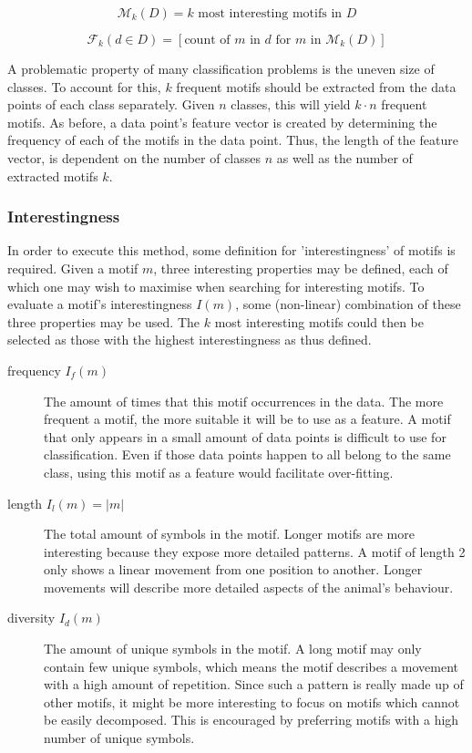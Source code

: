 \documentclass[conference,a4paper,twoside]{IEEEtran}
\begin{document}
\begin{equation}
    \label{eq:kmotifs}
    \mathcal{M}_k(D) = \text{$k$ most interesting motifs in $D$}
\end{equation}

\begin{equation}
    \label{eq:features}
    \mathcal{F}_k(d \in D) = \left[ \text{count of $m$ in $d$} \text{ for } m \text{ in } \mathcal{M}_k(D) \right]
\end{equation}

A problematic property of many classification problems is the uneven size of classes. To account for this, $k$ frequent motifs should be extracted from the data points of each class separately. Given $n$ classes, this will yield $k \cdot n$ frequent motifs. As before, a data point's feature vector is created by determining the frequency of each of the motifs in the data point. Thus, the length of the feature vector, is dependent on the number of classes $n$ as well as the number of extracted motifs $k$.

\subsubsection{Interestingness}
\label{sec:methods_pruning}
In order to execute this method, some definition for 'interestingness' of motifs is required. Given a motif $m$, three interesting properties may be defined, each of which one may wish to maximise when searching for interesting motifs. To evaluate a motif's interestingness $I(m)$, some (non-linear) combination of these three properties may be used. The $k$ most interesting motifs could then be selected as those with the highest interestingness as thus defined.

\begin{description}
    \item[frequency $I_f(m)$] The amount of times that this motif occurrences in the data. The more frequent a motif, the more suitable it will be to use as a feature. A motif that only appears in a small amount of data points is difficult to use for classification. Even if those data points happen to all belong to the same class, using this motif as a feature would facilitate over-fitting.
    \item[length $I_l(m) = |m|$] The total amount of symbols in the motif. Longer motifs are more interesting because they expose more detailed patterns. A motif of length 2 only shows a linear movement from one position to another. Longer movements will describe more detailed aspects of the animal's behaviour.
    \item[diversity $I_d(m)$] The amount of unique symbols in the motif. A long motif may only contain few unique symbols, which means the motif describes a movement with a high amount of repetition. Since such a pattern is really made up of other motifs, it might be more interesting to focus on motifs which cannot be easily decomposed. This is encouraged by preferring motifs with a high number of unique symbols.
\end{description}
\end{document}
